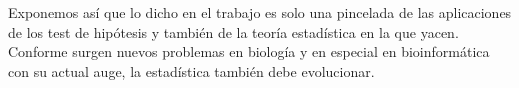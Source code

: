 \documentclass[a4paper,12pt]{article}
\begin{document}
Exponemos así que lo dicho en el trabajo es solo una pincelada de las aplicaciones de los test de hipótesis y también de la teoría estadística en la que yacen. Conforme surgen nuevos problemas en biología y en especial en bioinformática con su actual auge, la estadística también debe evolucionar.































\end{document}
